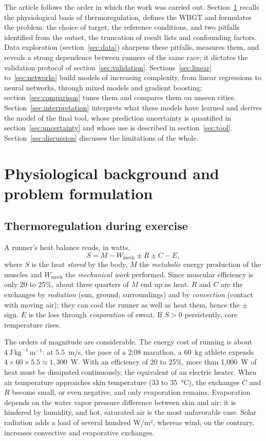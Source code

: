 \documentclass[11pt,a4paper]{article}
\begin{document}
The article follows the order in which the work was carried out. Section~\ref{sec:framework} recalls the
physiological basis of thermoregulation, defines the WBGT and formulates the problem: the choice of target, the
reference conditions, and two pitfalls identified from the outset, the truncation of result lists and confounding
factors. Data exploration (section~\ref{sec:data}) sharpens these pitfalls, measures them, and reveals a strong
dependence between runners of the same race; it dictates the validation protocol of section~\ref{sec:validation}.
Sections~\ref{sec:linear} to~\ref{sec:networks} build models of increasing complexity, from linear regressions to
neural networks, through mixed models and gradient boosting; section~\ref{sec:comparison} tunes them and compares
them on unseen cities. Section~\ref{sec:interpretation} interprets what these models have learned and derives the
model of the final tool, whose prediction uncertainty is quantified in section~\ref{sec:uncertainty} and whose use is
described in section~\ref{sec:tool}. Section~\ref{sec:discussion} discusses the limitations of the whole.

\section{Physiological background and problem formulation}\label{sec:framework}

\subsection{Thermoregulation during exercise}\label{sec:physio}

A runner's heat balance reads, in watts,
\[
S = M - W_{\text{mech}} \pm R \pm C - E,
\]
where $S$ is the heat \emph{stored} by the body, $M$ the \emph{metabolic} energy production of the muscles and
$W_{\text{mech}}$ the \emph{mechanical work} performed. Since muscular efficiency is only 20 to 25\%, about three
quarters of $M$ end up as heat. $R$ and $C$ are the exchanges by \emph{radiation} (sun, ground, surroundings) and by
\emph{convection} (contact with moving air); they can cool the runner as well as heat them, hence the $\pm$ sign. $E$
is the loss through \emph{evaporation} of sweat. If $S > 0$ persistently, core temperature rises.

The orders of magnitude are considerable. The energy cost of running is about
$4~\text{J}\,\text{kg}^{-1}\,\text{m}^{-1}$: at $5.5$~m/s, the pace of a 2:08 marathon, a 60~kg athlete expends
$4 \times 60 \times 5.5 \approx 1{,}300$~W. With an efficiency of 20 to 25\%, more than 1,000~W of heat must be
dissipated continuously, the equivalent of an electric heater. When air temperature approaches skin temperature (33
to 35~°C), the exchanges $C$ and $R$ become small, or even negative, and only evaporation remains. Evaporation depends
on the water vapor pressure difference between skin and air: it is hindered by humidity, and hot, saturated air is the
most unfavorable case. Solar radiation adds a load of several hundred W/m², whereas wind, on the contrary, increases
convective and evaporative exchanges.
\end{document}
